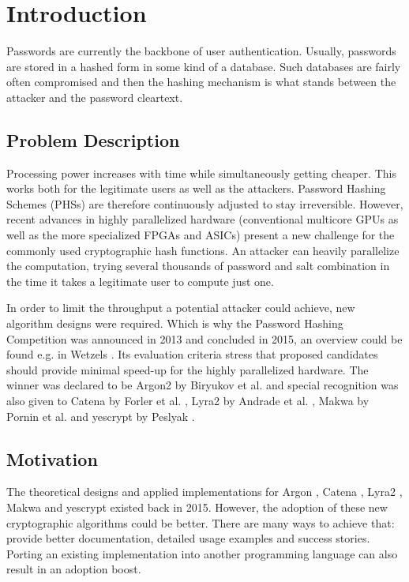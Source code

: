 \chapter{Introduction}
\label{sec:introduction}
Passwords are currently the backbone of user authentication. Usually, passwords are stored in a hashed form in some kind of a database. Such databases are fairly often compromised and then the hashing mechanism is what stands between the attacker and the password cleartext.

\section{Problem Description}
Processing power increases with time while simultaneously getting cheaper. This works both for the legitimate users as well as the attackers. Password Hashing Schemes (PHSs) are therefore continuously adjusted to stay irreversible. However, recent advances in highly parallelized hardware (conventional multicore GPUs as well as the more specialized FPGAs and ASICs) present a new challenge for the commonly used cryptographic hash functions. An attacker can heavily parallelize the computation, trying several thousands of password and salt combination in the time it takes a legitimate user to compute just one.

In order to limit the throughput a potential attacker could achieve, new algorithm designs were required. Which is why the Password Hashing Competition was announced in 2013 and concluded in 2015, an overview could be found e.g. in Wetzels \cite{wetzels:2016:phc}. Its evaluation criteria stress that proposed candidates should provide minimal speed-up for the highly parallelized hardware. The winner was declared to be Argon2 by Biryukov et al. \cite{biryukov:2015:argon2} and special recognition was also given to Catena by Forler et al. \cite{forler:2013:catena}, Lyra2 by Andrade et al. \cite{andrade:2016:lyra2,marcos:2015:lyra2}, Makwa by Pornin et al. \cite{pornin:2015:makwa} and yescrypt by Peslyak \cite{peslyak:2015:yescrypt}.

\section{Motivation}
The theoretical designs and applied implementations for Argon \cite{biryukov:2015:argon2}, Catena \cite{forler:2013:catena}, Lyra2 \cite{andrade:2016:lyra2,marcos:2015:lyra2}, Makwa \cite{pornin:2015:makwa} and yescrypt \cite{peslyak:2015:yescrypt} existed back in 2015. However, the adoption of these new cryptographic algorithms could be better. There are many ways to achieve that: provide better documentation, detailed usage examples and success stories. Porting an existing implementation into another programming language can also result in an adoption boost.

